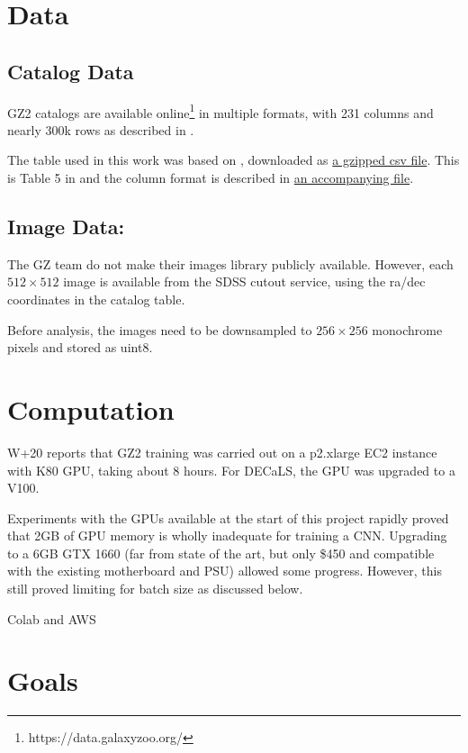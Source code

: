 \documentclass[twocolumn, twocolappendix, tighten]{aastex631}
\newcommand{\todo}{\color{red}{TODO}\color{black}\hspace{2mm}}
\begin{document}
\section{Data} \label{sec:data}

\subsection{Catalog Data} 

GZ2 catalogs are available online\footnote{https://data.galaxyzoo.org/} in multiple formats, with 231 columns and nearly 300k rows as described in \citet{willett_galaxy_2013}.

The table used in this work was based on \citet{2016MNRAS.461.3663H}, downloaded as \href{https://zooniverse-data.s3.amazonaws.com/galaxy-zoo-2/zoo2MainSpecz.csv.gz}{a gzipped csv file}.  This is Table 5 in \citet{willett_galaxy_2013} and the column format is described in \href{https://data.galaxyzoo.org/data/gz2/zoo2MainSpecz.txt}{an accompanying file}.

\subsection{Image Data:} 
The GZ team do not make their images library publicly available. However, each $512 \times 512$ image is available from the SDSS cutout service, using the ra/dec coordinates in the catalog table.

Before analysis, the images need to be downsampled to $256 \times 256$ monochrome pixels and stored as uint8.



\section{Computation} \label{sec:comp}

W+20 reports that GZ2 training was carried out on a p2.xlarge EC2 instance with K80 GPU, taking about 8 hours. For DECaLS, the GPU was upgraded to a V100.

Experiments with the GPUs available at the start of this project rapidly proved that 2GB of GPU memory is wholly inadequate for training a CNN. Upgrading to a 6GB GTX 1660 (far from state of the art, but only \$450 and compatible with the existing motherboard and PSU) allowed some progress. However, this still proved limiting for batch size as discussed below.

\todo Colab and AWS


\section{Goals} \label{sec:goals}
\end{document}
